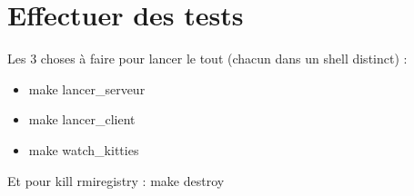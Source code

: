 \documentclass[twoside]{article}
\begin{document}
\section{Effectuer des tests}
Les 3 choses à faire pour lancer le tout (chacun dans un shell distinct) :
\begin{itemize}
	\item make lancer\_serveur
	\item make lancer\_client
	\item make watch\_kitties
\end{itemize}
Et pour kill rmiregistry :
	make destroy


\end{document}
